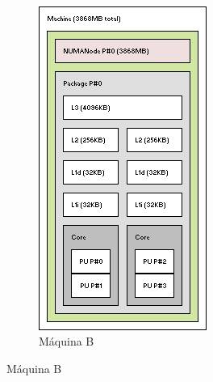 \begin{figure}
	~
	\begin{subfigure}{.4\textwidth}
		\caption{Máquina B}
		\includegraphics[width=\textwidth]{rec/img/MaqB}
	\end{subfigure}

\end{figure}

